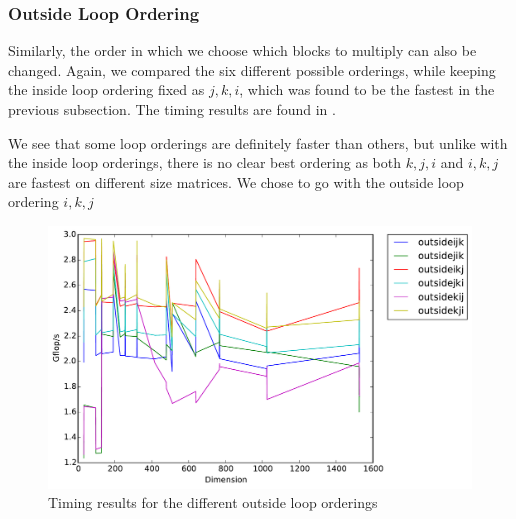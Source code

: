 \subsubsection{Outside Loop Ordering}
Similarly, the order in which we choose which blocks to multiply can also be
changed. Again, we compared the six different possible orderings, while
keeping the inside loop ordering fixed as $j,k,i$, which was found to be the
fastest in the previous subsection. The timing results are found in
.

We see that some loop orderings are definitely faster than others, but unlike
with the inside loop orderings, there is no clear best ordering as both $k,j,i$
and $i,k,j$ are fastest on different size matrices. We chose to go with the
outside loop ordering $i,k,j$

\begin{figure}[hh]
  \centering
  \includegraphics[width=\textwidth]{img/timing_outsideloops.pdf}
  \caption{Timing results for the different outside loop orderings}
  \label{fig:outsideloop}
\end{figure}

